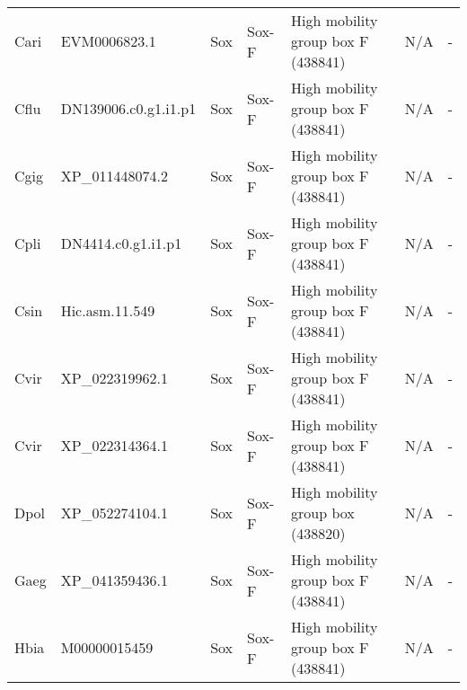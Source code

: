 \documentclass[../main.tex]{subfiles}
\begin{document}
\begin{landscape}
\begin{longtable}{lllllll}
		Cari           & EVM0006823.1          & Sox            & Sox-F               & High mobility group box F (438841)          & N/A                                                                    & -                    \\
		Cflu           & DN139006.c0.g1.i1.p1  & Sox            & Sox-F               & High mobility group box F (438841)          & N/A                                                                    & -                    \\
		Cgig           & XP\_011448074.2       & Sox            & Sox-F               & High mobility group box F (438841)          & N/A                                                                    & -                    \\
		Cpli           & DN4414.c0.g1.i1.p1    & Sox            & Sox-F               & High mobility group box F (438841)          & N/A                                                                    & -                    \\
		Csin           & Hic.asm.11.549        & Sox            & Sox-F               & High mobility group box F (438841)          & N/A                                                                    & -                    \\
		Cvir           & XP\_022319962.1       & Sox            & Sox-F               & High mobility group box F (438841)          & N/A                                                                    & -                    \\
		Cvir           & XP\_022314364.1       & Sox            & Sox-F               & High mobility group box F (438841)          & N/A                                                                    & -                    \\
		Dpol           & XP\_052274104.1       & Sox            & Sox-F               & High mobility group box (438820)            & N/A                                                                    & -                    \\
		Gaeg           & XP\_041359436.1       & Sox            & Sox-F               & High mobility group box F (438841)          & N/A                                                                    & -                    \\
		Hbia           & M00000015459          & Sox            & Sox-F               & High mobility group box F (438841)          & N/A                                                                    & -                    \\

\end{longtable}
\end{landscape}
\end{document}
